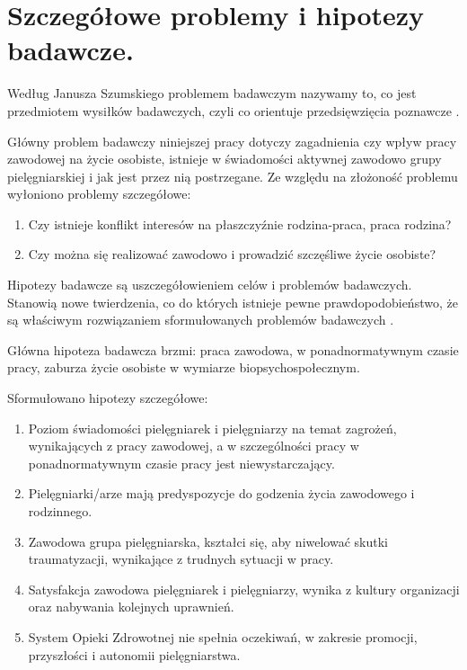 \documentclass[a4paper,12pt,twoside,openany]{report}
\begin{document}
\section{Szczegółowe problemy i hipotezy badawcze.}
Według Janusza Szumskiego problemem badawczym nazywamy to, co jest przedmiotem wysiłków badawczych, czyli co orientuje przedsięwzięcia poznawcze \cite{janusz}.

Główny problem badawczy niniejszej pracy dotyczy zagadnienia czy wpływ pracy zawodowej na życie osobiste, istnieje w świadomości aktywnej zawodowo grupy pielęgniarskiej i jak jest przez nią postrzegane. Ze względu na złożoność problemu wyłoniono problemy szczegółowe:
\begin{enumerate}
	\item Czy istnieje konflikt interesów na płaszczyźnie rodzina-praca, praca rodzina?
	\item Czy można się realizować zawodowo i prowadzić szczęśliwe życie osobiste?
\end{enumerate}

Hipotezy badawcze są uszczegółowieniem celów i problemów badawczych. Stanowią nowe twierdzenia, co do których istnieje pewne prawdopodobieństwo, że są właściwym rozwiązaniem sformułowanych problemów badawczych \cite{janusz}.

Główna hipoteza badawcza brzmi: praca zawodowa, w ponadnormatywnym czasie pracy, zaburza życie osobiste w wymiarze biopsychospołecznym.

Sformułowano hipotezy szczegółowe:
\begin{enumerate}
	\item Poziom świadomości pielęgniarek i pielęgniarzy na temat zagrożeń, wynikających z pracy zawodowej, a w szczególności pracy w ponadnormatywnym czasie pracy jest niewystarczający.
	\item Pielęgniarki/arze mają predyspozycje do godzenia życia zawodowego i rodzinnego.
	\item Zawodowa grupa pielęgniarska, kształci się, aby niwelować skutki traumatyzacji, wynikające z trudnych sytuacji w pracy.
	\item Satysfakcja zawodowa pielęgniarek i pielęgniarzy, wynika z kultury organizacji oraz nabywania kolejnych uprawnień.
	\item System Opieki Zdrowotnej nie spełnia oczekiwań, w zakresie promocji, przyszłości i autonomii pielęgniarstwa.
\end{enumerate}
\end{document}

